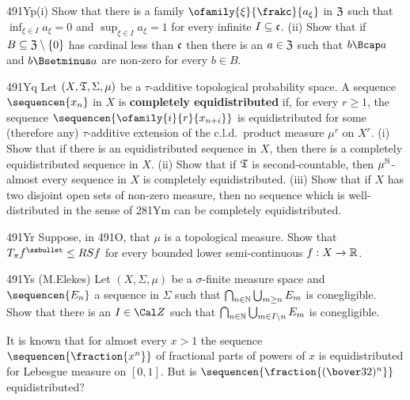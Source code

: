{\spheader 491Yp(i)
Show that there is a family $\ofamily{\xi}{\frakc}{a_{\xi}}$ in
$\frak Z$ such that
$\inf_{\xi\in I}a_{\xi}=0$ and $\sup_{\xi\in I}a_{\xi}=1$ for every
infinite $I\subseteq\frak c$.   (ii) Show that if
$B\subseteq\frak Z\setminus\{0\}$ has cardinal less than $\frak c$
then
there is an $a\in\frak Z$ such that $b\Bcap a$ and $b\Bsetminus a$ are
non-zero for every $b\in B$.

\spheader 491Yq Let $(X,\frak T,\Sigma,\mu)$ be a $\tau$-additive
topological probability space.   A sequence $\sequencen{x_n}$ in $X$ is
{\bf completely equidistributed} if, for every $r\ge 1$, the sequence
$\sequencen{\ofamily{i}{r}{x_{n+i}}}$ is equidistributed for some
(therefore any) $\tau$-additive extension of the c.l.d.\ product measure
$\mu^r$ on $X^r$.   (i) Show that if there is an equidistributed sequence
in $X$, then there is a completely equidistributed sequence in $X$.   (ii)
Show that if $\frak T$ is second-countable, then $\mu^{\Bbb N}$-almost
every sequence in $X$ is completely equidistributed.   (iii) Show that
if $X$ has two disjoint open sets of non-zero measure, then no sequence
which is well-distributed in the sense of 281Ym can
be completely equidistributed.

\spheader 491Yr Suppose,
in 491O, that $\mu$ is a topological measure.   Show
that $T_{\pi}f^{\ssbullet}\le RSf$ for every bounded lower semi-continuous
$f:X\to\Bbb R$.

\spheader 491Ys (M.Elekes)
Let $(X,\Sigma,\mu)$ be a $\sigma$-finite measure
space and $\sequencen{E_n}$ a sequence in $\Sigma$ such that
$\bigcap_{n\in\Bbb N}\bigcup_{m\ge n}E_m$ is conegligible.
Show that there is an $I\in\Cal Z$ such that
$\bigcap_{n\in\Bbb N}\bigcup_{m\in I\setminus n}E_m$ is conegligible.
}%

 It is known that for almost every $x>1$ the
sequence $\sequencen{\fraction{x^n}}$ of fractional parts of powers of $x$ is
equidistributed for Lebesgue measure on
$[0,1]$.   But is
$\sequencen{\fraction{(\bover32)^n}}$ equidistributed?



